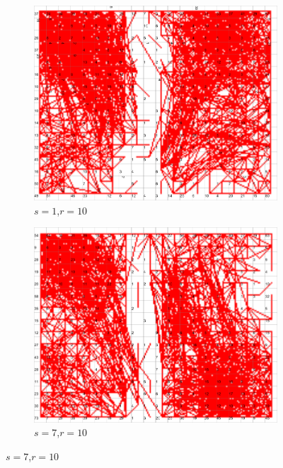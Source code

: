\documentclass{acm_proc_article-sp}
\begin{document}
\begin{figure}
\centering
    \centering
    \begin{subfigure}[b]{0.30\linewidth}
        \includegraphics[width=\linewidth]{img/wine-newmid-radius-neighbourhood-graph--r-10-seed-1}
        \caption{$s=1$,$r=10$}
        \label{fig:wine-newmid-radius-neighbourhood-graph--r-10-seed-1}
    \end{subfigure}
    \begin{subfigure}[b]{0.30\linewidth}
        \includegraphics[width=\linewidth]{img/wine-newmid-radius-neighbourhood-graph--r-10-seed-7}
        \caption{$s=7$,$r=10$}

\end{subfigure}
\end{figure}
\end{document}
